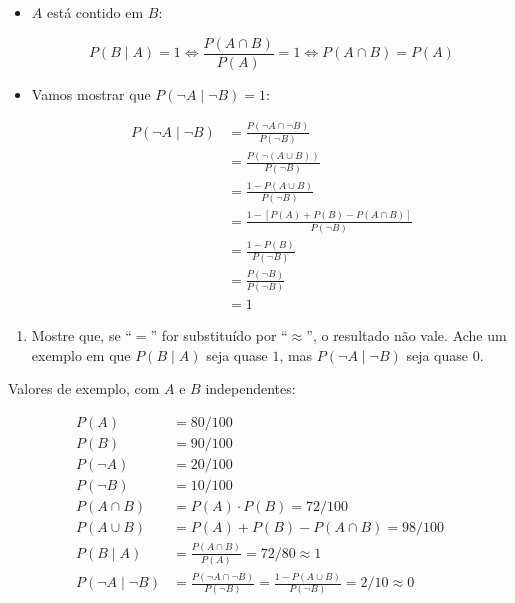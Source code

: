 \documentclass[
  11pt]{report}
\providecommand{\tightlist}{%
  \setlength{\itemsep}{0pt}\setlength{\parskip}{0pt}}
\begin{document}
\begin{itemize}
\item
  $A$ está contido em $B$:

  \[
  P(B \mid A) = 1 
  \iff \frac{P(A \cap B)}{P(A)} = 1
  \iff P(A \cap B) = P(A)
  \]
\item
  Vamos mostrar que $P(\neg A \mid \neg B) = 1$:

  \[
  \begin{aligned}
  P(\neg A \mid \neg B) 
  &= \frac{P(\neg A \cap \neg B)}{P(\neg B)} \\
  &= \frac{P(\neg (A \cup B))}{P(\neg B)} \\
  &= \frac{1 - P(A \cup B)}{P(\neg B)} \\
  &= \frac{1 - \left[ P(A) + P(B) - P(A \cap B) \right]}{P(\neg B)} \\
  &= \frac{1 - P(B)}{P(\neg B)} \\
  &= \frac{P(\neg B)}{P(\neg B)} \\
  &= 1
  \end{aligned}
  \]
\end{itemize}

\begin{rmdbox}

\begin{enumerate}
\def\labelenumi{\alph{enumi}.}
\setcounter{enumi}{1}
\tightlist
\item
  Mostre que, se ``$=$'' for substituído por ``$\approx$'', o resultado não vale. Ache um exemplo em que $P(B \mid A)$ seja quase $1$, mas $P(\neg A \mid \neg B)$ seja quase $0$.
\end{enumerate}

\end{rmdbox}

Valores de exemplo, com $A$ e $B$ independentes:

\[
\begin{aligned}
P(A) &= 80/100 \\
P(B) &= 90/100 \\
P(\neg A) &= 20/100 \\
P(\neg B) &= 10/100 \\
P(A \cap B) &= P(A) \cdot P(B) = 72/100 \\
P(A \cup B) &= P(A) + P(B) - P(A \cap B) = 98/100\\
P(B \mid A) &= \frac{P(A \cap B)}{P(A)} = 72/80 \approx 1 \\
P(\neg A \mid \neg B) &= \frac{P(\neg A \cap \neg B)}{P(\neg B)} = 
  \frac{1 - P(A \cup B)}{P(\neg B)} = 2/10 \approx 0
\end{aligned}
\]
\end{document}
